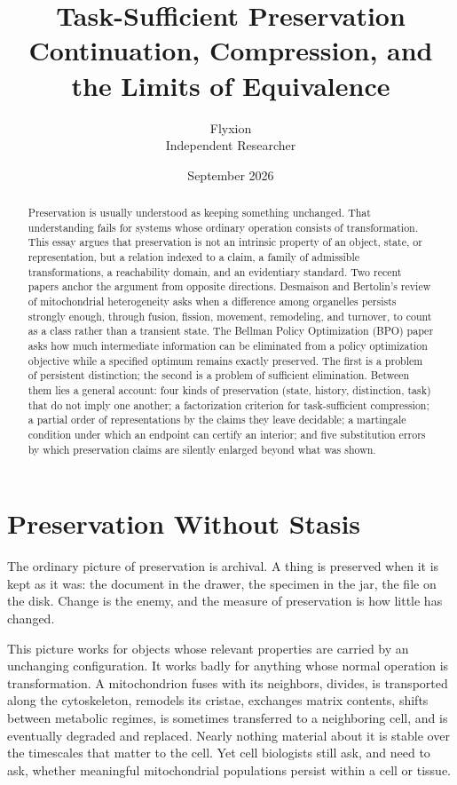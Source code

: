\documentclass[11pt]{article}
\title{Task-Sufficient Preservation\\[4pt]
\large Continuation, Compression, and the Limits of Equivalence}
\author{Flyxion\\ \small Independent Researcher}
\date{September 2026}
\theoremstyle{remark}
\begin{document}
\maketitle

\begin{abstract}
Preservation is usually understood as keeping something unchanged. That understanding fails for systems whose ordinary operation consists of transformation. This essay argues that preservation is not an intrinsic property of an object, state, or representation, but a relation indexed to a claim, a family of admissible transformations, a reachability domain, and an evidentiary standard. Two recent papers anchor the argument from opposite directions. Desmaison and Bertolin's review of mitochondrial heterogeneity asks when a difference among organelles persists strongly enough, through fusion, fission, movement, remodeling, and turnover, to count as a class rather than a transient state. The Bellman Policy Optimization (BPO) paper asks how much intermediate information can be eliminated from a policy optimization objective while a specified optimum remains exactly preserved. The first is a problem of persistent distinction; the second is a problem of sufficient elimination. Between them lies a general account: four kinds of preservation (state, history, distinction, task) that do not imply one another; a factorization criterion for task-sufficient compression; a partial order of representations by the claims they leave decidable; a martingale condition under which an endpoint can certify an interior; and five substitution errors by which preservation claims are silently enlarged beyond what was shown.
\end{abstract}

\section{Preservation Without Stasis}

The ordinary picture of preservation is archival. A thing is preserved when it is kept as it was: the document in the drawer, the specimen in the jar, the file on the disk. Change is the enemy, and the measure of preservation is how little has changed.

This picture works for objects whose relevant properties are carried by an unchanging configuration. It works badly for anything whose normal operation is transformation. A mitochondrion fuses with its neighbors, divides, is transported along the cytoskeleton, remodels its cristae, exchanges matrix contents, shifts between metabolic regimes, is sometimes transferred to a neighboring cell, and is eventually degraded and replaced. Nearly nothing material about it is stable over the timescales that matter to the cell. Yet cell biologists still ask, and need to ask, whether meaningful mitochondrial populations persist within a cell or tissue.
\end{document}
